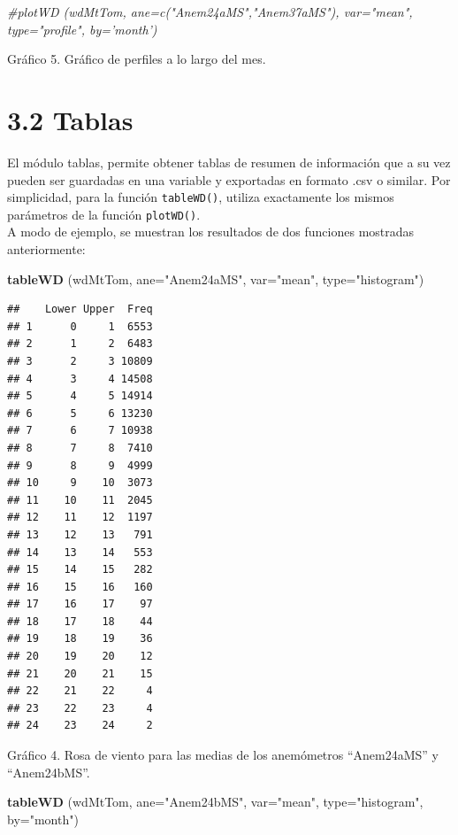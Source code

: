 \documentclass[]{article}
\newenvironment{Shaded}{\begin{snugshade}}{\end{snugshade}}
\newcommand{\KeywordTok}[1]{\textcolor[rgb]{0.13,0.29,0.53}{\textbf{{#1}}}}
\newcommand{\DataTypeTok}[1]{\textcolor[rgb]{0.13,0.29,0.53}{{#1}}}
\newcommand{\StringTok}[1]{\textcolor[rgb]{0.31,0.60,0.02}{{#1}}}
\newcommand{\CommentTok}[1]{\textcolor[rgb]{0.56,0.35,0.01}{\textit{{#1}}}}
\newcommand{\NormalTok}[1]{{#1}}
\begin{document}
\begin{Shaded}
\begin{Highlighting}[]
\CommentTok{#plotWD (wdMtTom, ane=c("Anem24aMS","Anem37aMS"), var="mean", type="profile", by='month')}
\end{Highlighting}
\end{Shaded}

Gráfico 5. Gráfico de perfiles a lo largo del mes.

\section{3.2 Tablas}\label{tablas}

El módulo tablas, permite obtener tablas de resumen de información que a
su vez pueden ser guardadas en una variable y exportadas en formato .csv
o similar. Por simplicidad, para la función \texttt{tableWD()}, utiliza
exactamente los mismos parámetros de la función \texttt{plotWD()}.\\A
modo de ejemplo, se muestran los resultados de dos funciones mostradas
anteriormente:

\begin{Shaded}
\begin{Highlighting}[]
\KeywordTok{tableWD} \NormalTok{(wdMtTom, }\DataTypeTok{ane=}\StringTok{"Anem24aMS"}\NormalTok{, }\DataTypeTok{var=}\StringTok{"mean"}\NormalTok{, }\DataTypeTok{type=}\StringTok{"histogram"}\NormalTok{)}
\end{Highlighting}
\end{Shaded}

\begin{verbatim}
##    Lower Upper  Freq
## 1      0     1  6553
## 2      1     2  6483
## 3      2     3 10809
## 4      3     4 14508
## 5      4     5 14914
## 6      5     6 13230
## 7      6     7 10938
## 8      7     8  7410
## 9      8     9  4999
## 10     9    10  3073
## 11    10    11  2045
## 12    11    12  1197
## 13    12    13   791
## 14    13    14   553
## 15    14    15   282
## 16    15    16   160
## 17    16    17    97
## 18    17    18    44
## 19    18    19    36
## 20    19    20    12
## 21    20    21    15
## 22    21    22     4
## 23    22    23     4
## 24    23    24     2
\end{verbatim}

Gráfico 4. Rosa de viento para las medias de los anemómetros
``Anem24aMS'' y ``Anem24bMS''.

\begin{Shaded}
\begin{Highlighting}[]
\KeywordTok{tableWD} \NormalTok{(wdMtTom, }\DataTypeTok{ane=}\StringTok{"Anem24bMS"}\NormalTok{, }\DataTypeTok{var=}\StringTok{"mean"}\NormalTok{, }\DataTypeTok{type=}\StringTok{"histogram"}\NormalTok{, }\DataTypeTok{by=}\StringTok{"month"}\NormalTok{)}
\end{Highlighting}
\end{Shaded}
\end{document}
